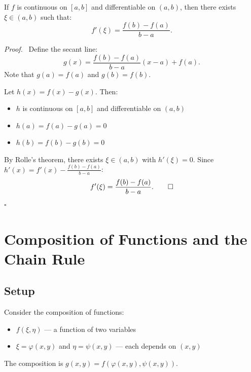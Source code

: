 \documentclass[11pt]{report}
\renewenvironment{proof}[1][Proof]{\par\noindent\textit{#1.}\ }{\hfill$\square$\par\medskip}
\begin{document}
\begin{theorem}
If $f$ is continuous on $[a, b]$ and differentiable on $(a, b)$, then there exists $\xi \in (a, b)$ such that:
\[
f'(\xi) = \frac{f(b) - f(a)}{b - a}.
\]
\end{theorem}

\begin{proof}
Define the secant line:
\[
g(x) = \frac{f(b) - f(a)}{b - a}(x - a) + f(a).
\]
Note that $g(a) = f(a)$ and $g(b) = f(b)$.

Let $h(x) = f(x) - g(x)$. Then:
\begin{itemize}[itemsep=2pt]
    \item $h$ is continuous on $[a, b]$ and differentiable on $(a, b)$
    \item $h(a) = f(a) - g(a) = 0$
    \item $h(b) = f(b) - g(b) = 0$
\end{itemize}

By Rolle's theorem, there exists $\xi \in (a, b)$ with $h'(\xi) = 0$. Since $h'(x) = f'(x) - \frac{f(b) - f(a)}{b - a}$:
\[
f'(\xi) = \frac{f(b) - f(a)}{b - a}. \qedhere
\]
\end{proof}

\section{Composition of Functions and the Chain Rule}

\subsection*{Setup}

Consider the composition of functions:
\begin{itemize}[itemsep=2pt]
    \item $f(\xi, \eta)$ — a function of two variables
    \item $\xi = \varphi(x, y)$ and $\eta = \psi(x, y)$ — each depends on $(x, y)$
\end{itemize}

The composition is $g(x, y) = f(\varphi(x, y), \psi(x, y))$.

\begin{center}
\end{center}
\end{document}
